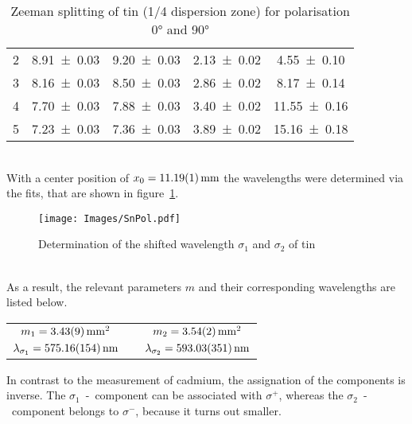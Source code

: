\begin{table}[ht]
\begin{minipage}{0.48\textwidth}
\begin{adjustbox}{width=\textwidth}
\begin{tabular}{c c c c c}
				2			& \num{8.91 \pm 0.03} 		& \num{9.20 \pm 0.03} 		& \num{2.13 \pm 0.02} 	& \num{4.55 \pm 0.10} 		\\
				3			& \num{8.16 \pm 0.03} 		& \num{8.50 \pm 0.03} 		& \num{2.86 \pm 0.02} 	& \num{8.17 \pm 0.14} 		\\
				4			& \num{7.70 \pm 0.03} 		& \num{7.88 \pm 0.03} 		& \num{3.40 \pm 0.02} 	& \num{11.55 \pm 0.16} 		\\
				5			& \num{7.23 \pm 0.03} 		& \num{7.36 \pm 0.03} 		& \num{3.89 \pm 0.02} 	& \num{15.16 \pm 0.18} 		\\
			\end{tabular}
		\end{adjustbox}
	\end{minipage}
	\caption[Zeeman Splitting of Sn]{Zeeman splitting of tin (1/4 dispersion zone) for polarisation \ang{0} and \ang{90}}
	\label{tab:SnZeeman}
\end{table}\\
With a center position of $x_0 = \SI{11.19 \pm 0.01}{\mm}$ the wavelengths were determined via the fits, that are shown in figure~\ref{fig:SnShift}.
\begin{figure}[ht]
	\centering
	\texttt{[image: Images/SnPol.pdf]}
	\caption[Determination of the Shifted Wavelength $\sigma_1$ \& $\sigma_2$ of Sn]{Determination of the shifted wavelength $\sigma_1$ and $\sigma_2$ of tin}
	\label{fig:SnShift}
\end{figure}\\
As a result, the relevant parameters $m$ and their corresponding wavelengths are listed below.
\begin{table}[ht]
	\centering
	\begin{tabular}{c p{2.0cm} c}
		$m_1 = \SI{3.43 \pm 0.09}{\mm\squared}$		& & $m_2 = \SI{3.54 \pm 0.02}{\mm\squared}$	\\
		$\lambda_{\sigma_1} = \SI{575.16 \pm 1.54}{\nm}$	& & $\lambda_{\sigma_2} = \SI{593.03 \pm 3.51}{\nm}$
	\end{tabular}
\end{table}
In contrast to the measurement of cadmium, the assignation of the components is inverse. 
The $\sigma_1$~-~component can be associated with $\sigma^+$, whereas the $\sigma_2$~-~component belongs to $\sigma^-$, because it turns out smaller.
